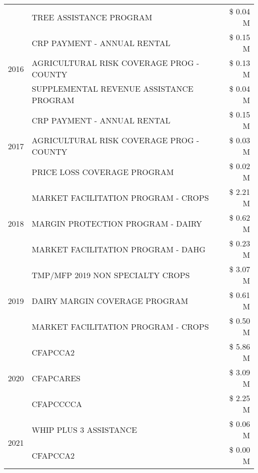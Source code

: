 \begin{tabular}{llr}
 & TREE ASSISTANCE PROGRAM & \$ 0.04 M \\
\cline{1-3}
\multirow[t]{3}{*}{2016} & CRP PAYMENT - ANNUAL RENTAL & \$ 0.15 M \\
 & AGRICULTURAL RISK COVERAGE PROG - COUNTY & \$ 0.13 M \\
 & SUPPLEMENTAL REVENUE ASSISTANCE PROGRAM & \$ 0.04 M \\
\cline{1-3}
\multirow[t]{3}{*}{2017} & CRP PAYMENT - ANNUAL RENTAL & \$ 0.15 M \\
 & AGRICULTURAL RISK COVERAGE PROG - COUNTY & \$ 0.03 M \\
 & PRICE LOSS COVERAGE PROGRAM & \$ 0.02 M \\
\cline{1-3}
\multirow[t]{3}{*}{2018} & MARKET FACILITATION PROGRAM - CROPS & \$ 2.21 M \\
 & MARGIN PROTECTION PROGRAM - DAIRY & \$ 0.62 M \\
 & MARKET FACILITATION PROGRAM - DAHG & \$ 0.23 M \\
\cline{1-3}
\multirow[t]{3}{*}{2019} & TMP/MFP 2019 NON SPECIALTY CROPS & \$ 3.07 M \\
 & DAIRY MARGIN COVERAGE PROGRAM & \$ 0.61 M \\
 & MARKET FACILITATION PROGRAM - CROPS & \$ 0.50 M \\
\cline{1-3}
\multirow[t]{3}{*}{2020} & CFAPCCA2 & \$ 5.86 M \\
 & CFAPCARES & \$ 3.09 M \\
 & CFAPCCCCA & \$ 2.25 M \\
\cline{1-3}
\multirow[t]{2}{*}{2021} & WHIP PLUS 3 ASSISTANCE & \$ 0.06 M \\
 & CFAPCCA2 & \$ 0.00 M \\
\cline{1-3}
\bottomrule
\end{tabular}
